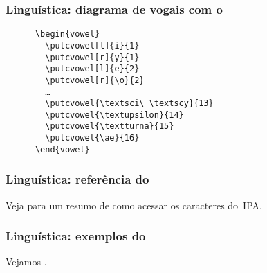 \begin{frame}[fragile]
  \frametitle{Linguística: diagrama de vogais com o }
  \large
  \begin{minipage}{.45\textwidth}
    \begin{verbatim}
      \begin{vowel}
        \putcvowel[l]{i}{1}
        \putcvowel[r]{y}{1}
        \putcvowel[l]{e}{2}
        \putcvowel[r]{\o}{2}
        …
        \putcvowel{\textsci\ \textscy}{13}
        \putcvowel{\textupsilon}{14}
        \putcvowel{\textturna}{15}
        \putcvowel{\ae}{16}
      \end{vowel}
    \end{verbatim}
  \end{minipage}
  \hfill
  \begin{minipage}{.45\textwidth}
    \begin{vowel}
    \end{vowel}
  \end{minipage}
\end{frame}

\begin{frame}
  \frametitle{Linguística: referência do }
  \huge
  Veja  para um resumo de como acessar os
  caracteres do~IPA.
\end{frame}

\begin{frame}
  \frametitle{Linguística: exemplos do }
  \huge
  Vejamos .
\end{frame}

